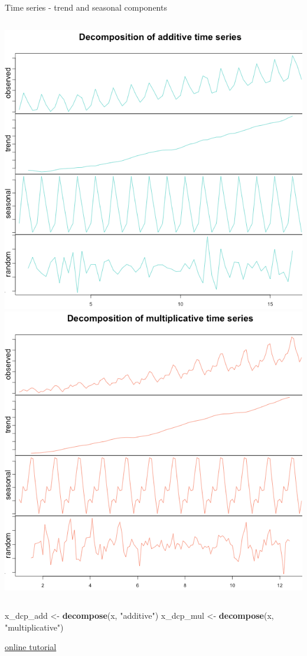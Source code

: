 \documentclass[9pt,ignorenonframetext,]{beamer}
\newenvironment{Shaded}{\begin{snugshade}}{\end{snugshade}}
\newcommand{\KeywordTok}[1]{\textcolor[rgb]{0.13,0.29,0.53}{\textbf{{#1}}}}
\newcommand{\StringTok}[1]{\textcolor[rgb]{0.31,0.60,0.02}{{#1}}}
\newcommand{\NormalTok}[1]{{#1}}
\newcommand{\columnsbegin}{\begin{columns}}
\newcommand{\columnsend}{\end{columns}}
\begin{document}
\begin{frame}[fragile]{Time series - trend and seasonal components}
\columnsbegin
{} \includegraphics{imgPres/additive-decompose.png}
\includegraphics{imgPres/multiplicative-decompose.png} \columnsend

\begin{Shaded}
\begin{Highlighting}[]
\NormalTok{x_dcp_add <-}\StringTok{ }\KeywordTok{decompose}\NormalTok{(x, }\StringTok{"additive"}\NormalTok{)}
\NormalTok{x_dcp_mul <-}\StringTok{ }\KeywordTok{decompose}\NormalTok{(x, }\StringTok{"multiplicative"}\NormalTok{)}
\end{Highlighting}
\end{Shaded}

\href{https://anomaly.io/seasonal-trend-decomposition-in-r/}{online
tutorial}

\end{frame}
\end{document}
